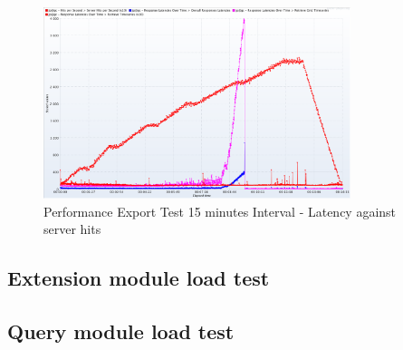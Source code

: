 \begin{figure}[htp]
    \centering
    \includegraphics[width=0.8\textwidth]{results/obs/export/obs_export_15m_res_latencies_against_hits.png}
    \caption{Performance Export Test 15 minutes Interval - Latency against server hits}
    \label{fi:test_obs_export_15m_latency}
\end{figure}



\subsection{Extension module load test}



\subsection{Query module load test}

